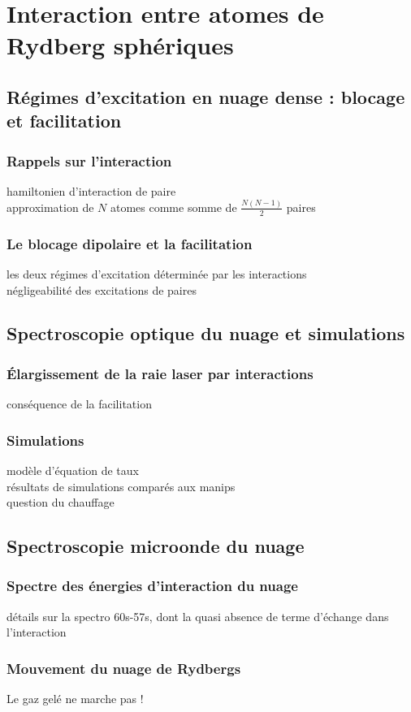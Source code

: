 \chapter{Interaction entre atomes de Rydberg sphériques}
\label{chapter:60s}

\section{Régimes d'excitation en nuage dense : blocage et facilitation}
	\subsection*{Rappels sur l'interaction}
		\noindent hamiltonien d'interaction de paire \\
		approximation de $N$ atomes comme somme de $\frac{N(N-1)}{2}$ paires
	\subsection*{Le blocage dipolaire et la facilitation}
		\noindent les deux régimes d'excitation déterminée par les interactions \\
		négligeabilité des excitations de paires		

\section{Spectroscopie optique du nuage et simulations}
	\subsection*{Élargissement de la raie laser par interactions}
		\noindent conséquence de la facilitation
	\subsection*{Simulations}
		\noindent modèle d'équation de taux\\
		\noindent résultats de simulations comparés aux manips\\
		\noindent question du chauffage
		
\section{Spectroscopie microonde du nuage}
	\subsection*{Spectre des énergies d'interaction du nuage}
		\noindent détails sur la spectro 60s-57s, dont la quasi absence de terme d'échange dans l'interaction
	\subsection*{Mouvement du nuage de Rydbergs}
		\noindent Le gaz gelé ne marche pas !